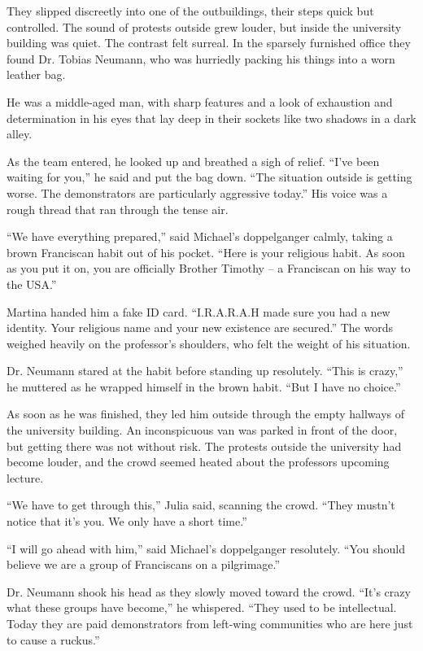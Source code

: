 \documentclass[
]{article}
\begin{document}
They slipped discreetly into one of the outbuildings, their steps quick
but controlled. The sound of protests outside grew louder, but inside
the university building was quiet. The contrast felt surreal. In the
sparsely furnished office they found Dr. Tobias Neumann, who was
hurriedly packing his things into a worn leather bag.

He was a middle-aged man, with sharp features and a look of exhaustion
and determination in his eyes that lay deep in their sockets like two
shadows in a dark alley.

As the team entered, he looked up and breathed a sigh of relief. ``I've
been waiting for you,'' he said and put the bag down. ``The situation
outside is getting worse. The demonstrators are particularly aggressive
today.'' His voice was a rough thread that ran through the tense air.

``We have everything prepared,'' said Michael's doppelganger calmly,
taking a brown Franciscan habit out of his pocket. ``Here is your
religious habit. As soon as you put it on, you are officially Brother
Timothy -- a Franciscan on his way to the USA.''

Martina handed him a fake ID card. ``I.R.A.R.A.H made sure you had a new
identity. Your religious name and your new existence are secured.'' The
words weighed heavily on the professor's shoulders, who felt the weight
of his situation.

Dr. Neumann stared at the habit before standing up resolutely. ``This is
crazy,'' he muttered as he wrapped himself in the brown habit. ``But I
have no choice.''

As soon as he was finished, they led him outside through the empty
hallways of the university building. An inconspicuous van was parked in
front of the door, but getting there was not without risk. The protests
outside the university had become louder, and the crowd seemed heated
about the professor\textquotesingle s upcoming lecture.

``We have to get through this,'' Julia said, scanning the crowd. ``They
mustn't notice that it's you. We only have a short time.''

``I will go ahead with him,'' said Michael's doppelganger resolutely.
``You should believe we are a group of Franciscans on a pilgrimage.''

Dr. Neumann shook his head as they slowly moved toward the crowd. ``It's
crazy what these groups have become,'' he whispered. ``They used to be
intellectual. Today they are paid demonstrators from left-wing
communities who are here just to cause a ruckus.''
\end{document}
